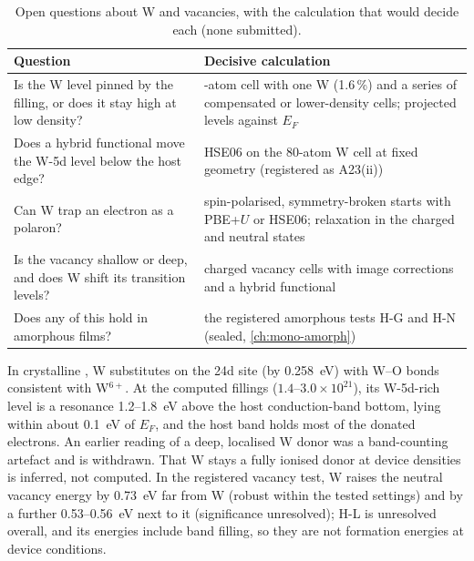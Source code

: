 \begin{table}[htbp]\centering\small
\caption{Open questions about W and vacancies, with the calculation that would decide each (none submitted).}
\label{tab:mono-w-open}
\begin{tabularx}{\linewidth}{@{}>{\raggedright\arraybackslash}p{4.8cm}>{\raggedright\arraybackslash}X@{}}
\toprule
Question & Decisive calculation \\\midrule
Is the W level pinned by the filling, or does it stay high at low density? & 160-atom cell with one W (1.6\,\%) and a series of
compensated or lower-density cells; projected levels against $E_F$ \\
Does a hybrid functional move the W-5d level below the host edge? & HSE06 on the 80-atom W cell at fixed geometry
(registered as A23(ii)) \\
Can W trap an electron as a polaron? & spin-polarised, symmetry-broken starts with PBE+$U$ or HSE06; relaxation in the
charged and neutral states \\
Is the vacancy shallow or deep, and does W shift its transition levels? & charged vacancy cells with image corrections and a
hybrid functional \citep{Freysoldt2014} \\
Does any of this hold in amorphous films? & the registered amorphous tests H-G and H-N (sealed, \cref{ch:mono-amorph}) \\\bottomrule
\end{tabularx}
\end{table}

\begin{keyresult}
In crystalline \InO{}, W substitutes on the 24d site (by 0.258~eV) with W--O bonds consistent with W$^{6+}$. At the
computed fillings ($1.4$--$3.0\times10^{21}$\cmcu{}), its W-5d-rich level is a resonance 1.2--1.8~eV above the host
conduction-band bottom, lying within about 0.1~eV of $E_F$, and the host band holds most of the donated electrons. An
earlier reading of a deep, localised W donor was a band-counting artefact and is withdrawn. That W stays a fully
ionised donor at device densities is inferred, not computed. In the registered vacancy test, W raises the neutral
vacancy energy by 0.73~eV far from W (robust within the tested settings) and by a further 0.53--0.56~eV next to it
(significance unresolved); H-L is unresolved overall, and its energies include band filling, so they are not formation
energies at device conditions.
\end{keyresult}
